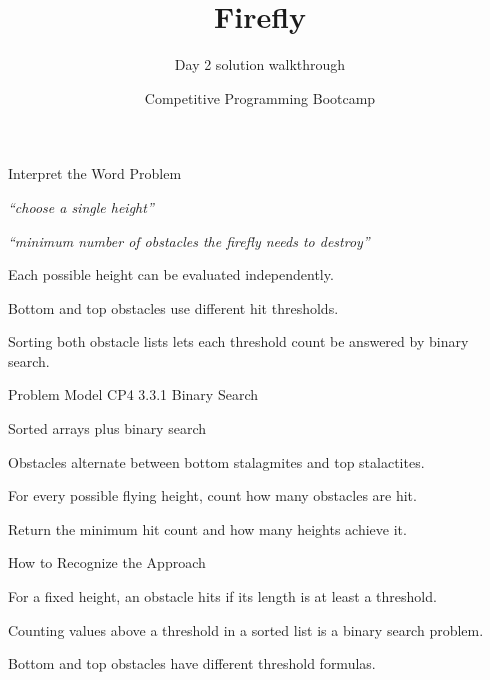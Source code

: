\documentclass[aspectratio=169,11pt]{beamer}
\title[firefly]{Firefly}
\subtitle{Day 2 solution walkthrough}
\author[Solution Deck]{Competitive Programming Bootcamp}
\date{}
\begin{document}
\begin{frame}[plain]
  \titlepage
\end{frame}

\begin{frame}{Interpret the Word Problem}
\small
{}
\begin{tightitemize}
  \item \textit{``choose a single height''}
  \item \textit{``minimum number of obstacles the firefly needs to destroy''}
\end{tightitemize}

\vspace{0.18cm}
\begin{tightitemize}
  \item Each possible height can be evaluated independently.
  \item Bottom and top obstacles use different hit thresholds.
  \item Sorting both obstacle lists lets each threshold count be answered by binary search.
\end{tightitemize}
\end{frame}







\begin{frame}{Problem Model}
\small
{} CP4 3.3.1 Binary Search

\vspace{0.25cm}
 Sorted arrays plus binary search

\vspace{0.25cm}
\begin{tightitemize}
  \item Obstacles alternate between bottom stalagmites and top stalactites.
  \item For every possible flying height, count how many obstacles are hit.
  \item Return the minimum hit count and how many heights achieve it.
\end{tightitemize}
\end{frame}

\begin{frame}{How to Recognize the Approach}
\begin{tightitemize}
  \item For a fixed height, an obstacle hits if its length is at least a threshold.
  \item Counting values above a threshold in a sorted list is a binary search problem.
  \item Bottom and top obstacles have different threshold formulas.
\end{tightitemize}
\end{frame}
\end{document}
